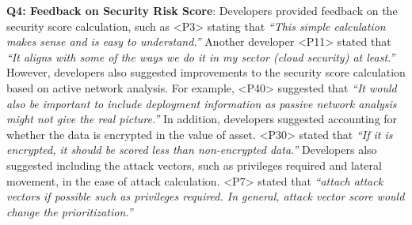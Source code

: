 \textbf{Q4: Feedback on Security Risk Score}: Developers provided feedback on the security score calculation, such as <P3> stating that \textit{``This simple calculation makes sense and is easy to understand.''} Another developer <P11> stated that \textit{``It aligns with some of the ways we do it in my sector (cloud security) at least.''} However, developers also suggested improvements to the security score calculation based on active network analysis. For example, <P40> suggested that \textit{``It would also be important to include deployment information as passive network analysis might not give the real picture.''} In addition, developers suggested accounting for whether the data is encrypted in the value of asset. <P30> stated that \textit{``If it is encrypted, it should be scored less than non-encrypted data.''} Developers also suggested including the attack vectors, such as privileges required and lateral movement, in the ease of attack calculation. <P7> stated that \textit{``attach attack vectors if possible such as privileges required. In general, attack vector score would change the prioritization.''} 


